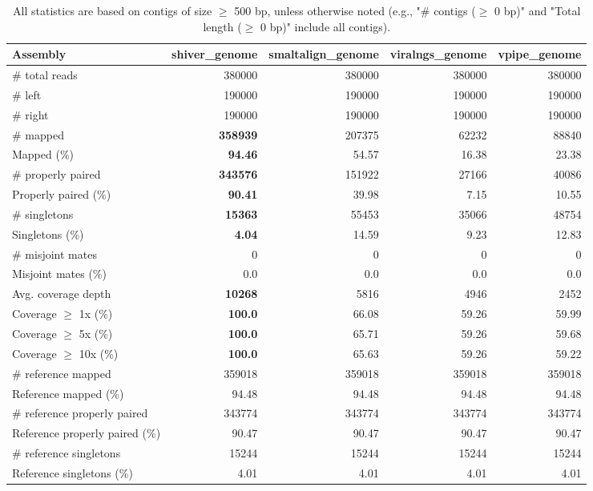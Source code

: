 \documentclass[12pt,a4paper]{article}
\begin{document}
\begin{table}[ht]
\begin{center}
\caption{All statistics are based on contigs of size $\geq$ 500 bp, unless otherwise noted (e.g., "\# contigs ($\geq$ 0 bp)" and "Total length ($\geq$ 0 bp)" include all contigs).}
\begin{tabular}{|l*{4}{|r}|}
\hline
Assembly & shiver\_genome & smaltalign\_genome & viralngs\_genome & vpipe\_genome \\ \hline
\# total reads & 380000 & 380000 & 380000 & 380000 \\ \hline
\# left & 190000 & 190000 & 190000 & 190000 \\ \hline
\# right & 190000 & 190000 & 190000 & 190000 \\ \hline
\# mapped & {\bf 358939} & 207375 & 62232 & 88840 \\ \hline
Mapped (\%) & {\bf 94.46} & 54.57 & 16.38 & 23.38 \\ \hline
\# properly paired & {\bf 343576} & 151922 & 27166 & 40086 \\ \hline
Properly paired (\%) & {\bf 90.41} & 39.98 & 7.15 & 10.55 \\ \hline
\# singletons & {\bf 15363} & 55453 & 35066 & 48754 \\ \hline
Singletons (\%) & {\bf 4.04} & 14.59 & 9.23 & 12.83 \\ \hline
\# misjoint mates & 0 & 0 & 0 & 0 \\ \hline
Misjoint mates (\%) & 0.0 & 0.0 & 0.0 & 0.0 \\ \hline
Avg. coverage depth & {\bf 10268} & 5816 & 4946 & 2452 \\ \hline
Coverage $\geq$ 1x (\%) & {\bf 100.0} & 66.08 & 59.26 & 59.99 \\ \hline
Coverage $\geq$ 5x (\%) & {\bf 100.0} & 65.71 & 59.26 & 59.68 \\ \hline
Coverage $\geq$ 10x (\%) & {\bf 100.0} & 65.63 & 59.26 & 59.22 \\ \hline
\# reference mapped & 359018 & 359018 & 359018 & 359018 \\ \hline
Reference mapped (\%) & 94.48 & 94.48 & 94.48 & 94.48 \\ \hline
\# reference properly paired & 343774 & 343774 & 343774 & 343774 \\ \hline
Reference properly paired (\%) & 90.47 & 90.47 & 90.47 & 90.47 \\ \hline
\# reference singletons & 15244 & 15244 & 15244 & 15244 \\ \hline
Reference singletons (\%) & 4.01 & 4.01 & 4.01 & 4.01 \\ \hline

\end{tabular}
\end{center}
\end{table}
\end{document}

